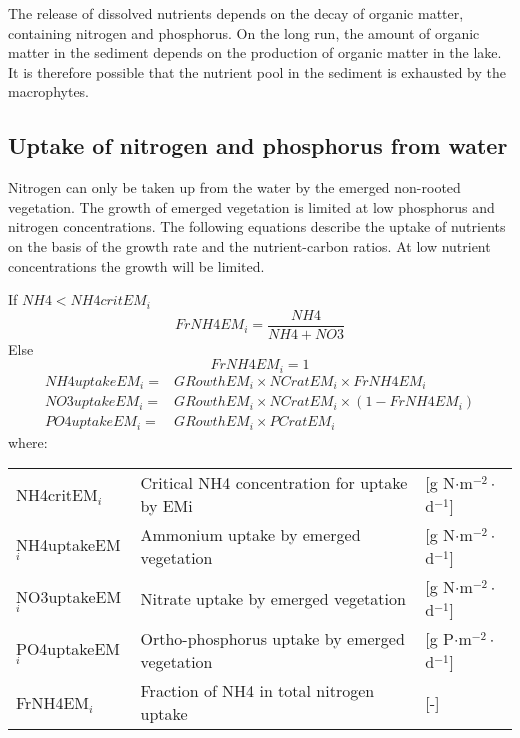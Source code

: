 The release of dissolved nutrients depends on the decay of organic matter, containing nitrogen and
phosphorus. On the long run, the amount of organic matter in the sediment depends on the production
of organic matter in the lake. It is therefore possible that the nutrient pool in the sediment is
exhausted by the macrophytes.

\subsection{Uptake of nitrogen and phosphorus from water}

Nitrogen can only be taken up from the water by the emerged non-rooted vegetation. The growth of emerged
vegetation is limited at low phosphorus and nitrogen concentrations. The following equations describe the
uptake of nutrients on the basis of the growth rate and the nutrient-carbon ratios. At low nutrient
concentrations the growth will be limited.

If $NH4 < NH4critEM_i$
%
\begin{equation}
\nonumber FrNH4EM_i = \frac{NH4}{NH4 + NO3}
\end{equation}
%
Else
%
\begin{equation}
          FrNH4EM_i = 1
\end{equation}
%
\begin{align}
\nonumber    NH4uptakeEM_i = &GRowthEM_i \times NCratEM_i \times FrNH4EM_i        \\
\nonumber    NO3uptakeEM_i = &GRowthEM_i \times NCratEM_i \times (1 - FrNH4EM_i)  \\
             PO4uptakeEM_i = &GRowthEM_i \times PCratEM_i
\end{align}
%
where:

\begin{tabular}{lll}
NH4critEM$_i$     & Critical NH4 concentration for uptake by EMi   & [g N$\cdot$m$^{-2}\cdot$d$^{-1}$] \\
NH4uptakeEM$_i$   & Ammonium uptake by emerged vegetation          & [g N$\cdot$m$^{-2}\cdot$d$^{-1}$] \\
NO3uptakeEM$_i$   & Nitrate uptake by emerged vegetation           & [g N$\cdot$m$^{-2}\cdot$d$^{-1}$] \\
PO4uptakeEM$_i$   & Ortho-phosphorus uptake by emerged vegetation  & [g P$\cdot$m$^{-2}\cdot$d$^{-1}$] \\
FrNH4EM$_i$       & Fraction of NH4 in total nitrogen uptake       & [-]                               \\
\end{tabular}

